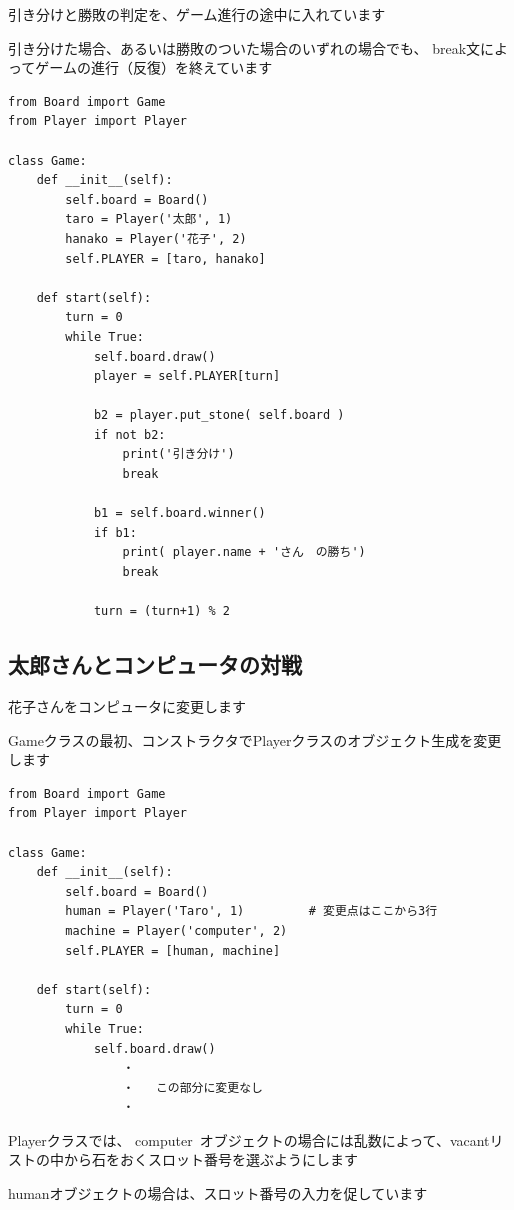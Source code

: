 \documentclass[uplatex,a4paper,11pt,oneside,openany]{jsbook}
\begin{document}
引き分けと勝敗の判定を、ゲーム進行の途中に入れています

引き分けた場合、あるいは勝敗のついた場合のいずれの場合でも、
break文によってゲームの進行（反復）を終えています

\begin{lstlisting}[caption=class Game,label=prog03-6]
from Board import Game
from Player import Player

class Game:
    def __init__(self):
        self.board = Board()
        taro = Player('太郎', 1)
        hanako = Player('花子', 2)
        self.PLAYER = [taro, hanako]

    def start(self):
        turn = 0
        while True:
            self.board.draw()
            player = self.PLAYER[turn]

            b2 = player.put_stone( self.board )
            if not b2:
                print('引き分け')
                break

            b1 = self.board.winner()
            if b1:
                print( player.name + 'さん　の勝ち')
                break

            turn = (turn+1) % 2
\end{lstlisting}%

\subsection{太郎さんとコンピュータの対戦}

花子さんをコンピュータに変更します

Gameクラスの最初、コンストラクタでPlayerクラスのオブジェクト生成を変更します

\begin{lstlisting}[caption=class Game,label=prog04-1]
from Board import Game
from Player import Player

class Game:
    def __init__(self):
        self.board = Board()
        human = Player('Taro', 1)         # 変更点はここから3行
        machine = Player('computer', 2)
        self.PLAYER = [human, machine]

    def start(self):
        turn = 0
        while True:
            self.board.draw()
                ・
                ・   この部分に変更なし
                ・
\end{lstlisting}%

Playerクラスでは、
computer オブジェクトの場合には乱数によって、vacantリストの中から石をおくスロット番号を選ぶようにします

humanオブジェクトの場合は、スロット番号の入力を促しています
\end{document}
